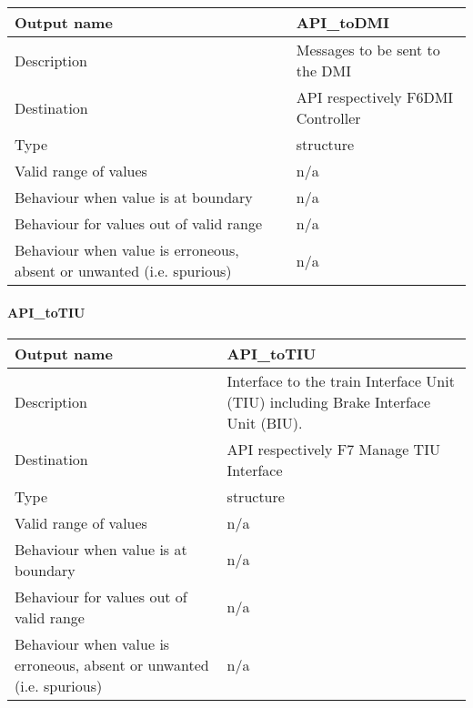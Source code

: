 \begin{longtable}{p{}p{}}
\toprule
Output name				& API\_toDMI \\
\midrule
Description				& Messages to be sent to the DMI \\
\midrule
Destination				& API respectively F6DMI Controller \\ 
\midrule
Type					& structure\\
\midrule
Valid range of values	& n/a \\
\midrule
Behaviour when value is at boundary	& n/a \\
\midrule
Behaviour for values out of valid range	& n/a\\
\midrule
Behaviour when value is erroneous, absent or unwanted (i.e. spurious) & n/a\\
\bottomrule
\end{longtable}

\paragraph{API\_toTIU}

\begin{longtable}{p{}p{}}
\toprule
Output name				& API\_toTIU \\
\midrule
Description				& Interface to the train Interface Unit (TIU) including Brake Interface Unit (BIU). \\
\midrule
Destination				& API respectively F7 Manage TIU Interface \\ 
\midrule
Type					& structure \\
\midrule
Valid range of values	& n/a \\
\midrule
Behaviour when value is at boundary	& n/a \\
\midrule
Behaviour for values out of valid range	& n/a\\
\midrule
Behaviour when value is erroneous, absent or unwanted (i.e. spurious) & n/a \\
\bottomrule
\end{longtable}